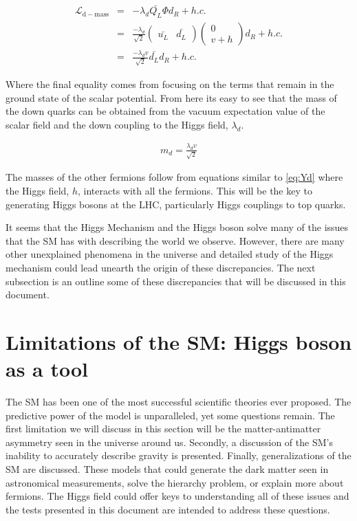 \begin{eqnarray}
\label{eq:Yd}
\mathscr{L}_{\mathrm{d-mass}} &=& -\lambda_{d}\bar{Q_{L}}\Phi d_{R} + h.c. \nonumber \\
 &=& \frac{-\lambda_{d}}{\sqrt{2}}\begin{pmatrix}\bar{u_{L}}& \bar{d_{L}}\end{pmatrix}\begin{pmatrix} 0 \\ v + h \end{pmatrix} d_{R} + h.c. \\
  &=& \frac{-\lambda_{d}v}{\sqrt{2}}\bar{d_{L}}d_{R} + h.c. \nonumber
\end{eqnarray}

Where the final equality comes from focusing on the terms that remain in the ground state of the scalar potential. From here its easy to see that the mass of the down quarks can be obtained from the vacuum expectation value of the scalar field and the down coupling to the Higgs field, $\lambda_{d}$.

\begin{eqnarray}
\label{eq:Md}
m_{d} = \frac{\lambda_{d}v}{\sqrt{2}} \nonumber
\end{eqnarray}

The masses of the other fermions follow from equations similar to \eqref{eq:Yd} where the Higgs field, $h$, interacts with all the fermions. This will be the key to generating Higgs bosons at the LHC, particularly Higgs couplings to top quarks.

It seems that the Higgs Mechanism and the Higgs boson solve many of the issues that the SM has with describing the world we observe. However, there are many other unexplained phenomena in the universe and detailed study of the Higgs mechanism could lead unearth the origin of these discrepancies. The next subsection is an outline some of these discrepancies that will be discussed in this document.

\section{Limitations of the SM: Higgs boson as a tool}
\label{sec:Limitations}

The SM has been one of the most successful scientific theories ever proposed. The predictive power of the model is unparalleled, yet some questions remain. The first limitation we will discuss in this section will be the matter-antimatter asymmetry seen in the universe around us. Secondly, a discussion of the SM's inability to accurately describe gravity is presented. Finally, generalizations of the SM are discussed. These models that could generate the dark matter seen in astronomical measurements, solve the hierarchy problem, or explain more about fermions. The Higgs field could offer keys to understanding all of these issues and the tests presented in this document are intended to address these questions.

